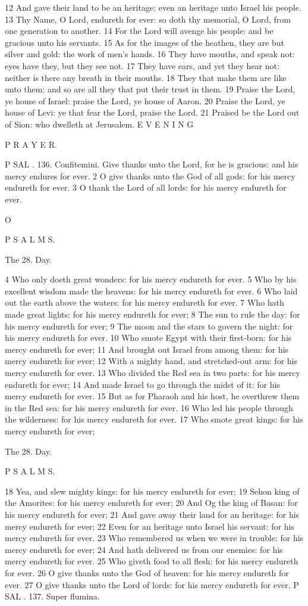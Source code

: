 12 And gave their land to be an heritage: even an heritage unto Israel his people. 13 Thy Name, O Lord, endureth for ever: so doth thy memorial, O Lord, from one generation to another. 14 For the Lord will avenge his people: and be gracious unto his servants. 15 As for the images of the heathen, they are but silver and gold: the work of men’s hands. 16 They have mouths, and speak not: eyes have they, but they see not. 17 They have ears, and yet they hear not: neither is there any breath in their mouths. 18 They that make them are like unto them: and so are all they that put their trust in them. 19 Praise the Lord, ye house of Israel: praise the Lord, ye house of Aaron. 20 Praise the Lord, ye house of Levi: ye that fear the Lord, praise the Lord. 21 Praised be the Lord out of Sion: who dwelleth at Jerusalem. E V E N I N G

P R A Y E R.

P SAL . 136. Confitemini. Give thanks unto the Lord, for he is gracious: and his mercy endures for ever. 2 O give thanks unto the God of all gods: for his mercy endureth for ever. 3 O thank the Lord of all lords: for his mercy endureth for ever.

O

P S A L M S.

The 28. Day.

4 Who only doeth great wonders: for his mercy endureth for ever. 5 Who by his excellent wisdom made the heavens: for his mercy endureth for ever. 6 Who laid out the earth above the waters: for his mercy endureth for ever. 7 Who hath made great lights: for his mercy endureth for ever; 8 The sun to rule the day: for his mercy endureth for ever; 9 The moon and the stars to govern the night: for his mercy endureth for ever. 10 Who smote Egypt with their first-born: for his mercy endureth for ever; 11 And brought out Israel from among them: for his mercy endureth for ever; 12 With a mighty hand, and stretched-out arm: for his mercy endureth for ever. 13 Who divided the Red sea in two parts: for his mercy endureth for ever; 14 And made Israel to go through the midst of it: for his mercy endureth for ever. 15 But as for Pharaoh and his host, he overthrew them in the Red sea: for his mercy endureth for ever. 16 Who led his people through the wilderness: for his mercy endureth for ever. 17 Who smote great kings: for his mercy endureth for ever;

The 28. Day.

P S A L M S.

18 Yea, and slew mighty kings: for his mercy endureth for ever; 19 Sehon king of the Amorites: for his mercy endureth for ever; 20 And Og the king of Basan: for his mercy endureth for ever; 21 And gave away their land for an heritage: for his mercy endureth for ever; 22 Even for an heritage unto Israel his servant: for his mercy endureth for ever. 23 Who remembered us when we were in trouble: for his mercy endureth for ever; 24 And hath delivered us from our enemies: for his mercy endureth for ever. 25 Who giveth food to all flesh: for his mercy endureth for ever. 26 O give thanks unto the God of heaven: for his mercy endureth for ever. 27 O give thanks unto the Lord of lords: for his mercy endureth for ever. P SAL . 137. Super flumina.

